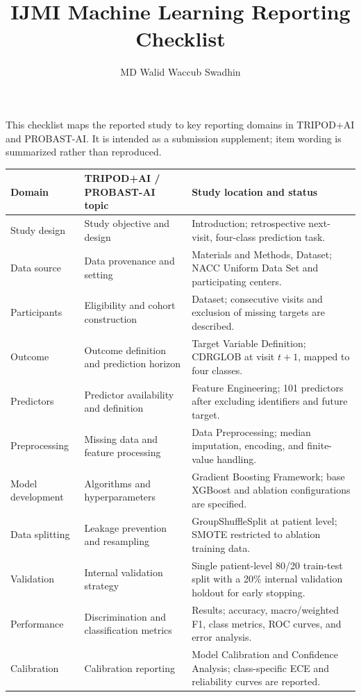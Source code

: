 \documentclass[preprint,12pt]{elsarticle}
\begin{document}
\begin{frontmatter}
\title{IJMI Machine Learning Reporting Checklist}
\author{MD Walid Waccub Swadhin}
\end{frontmatter}

This checklist maps the reported study to key reporting domains in TRIPOD+AI and PROBAST-AI. It is intended as a submission supplement; item wording is summarized rather than reproduced.

\begin{longtable}{p{}p{}p{}}
\toprule
\textbf{Domain} & \textbf{TRIPOD+AI / PROBAST-AI topic} & \textbf{Study location and status} \\
\midrule
\endhead
Study design & Study objective and design & Introduction; retrospective next-visit, four-class prediction task. \\
Data source & Data provenance and setting & Materials and Methods, Dataset; NACC Uniform Data Set and participating centers. \\
Participants & Eligibility and cohort construction & Dataset; consecutive visits and exclusion of missing targets are described. \\
Outcome & Outcome definition and prediction horizon & Target Variable Definition; CDRGLOB at visit $t+1$, mapped to four classes. \\
Predictors & Predictor availability and definition & Feature Engineering; 101 predictors after excluding identifiers and future target. \\
Preprocessing & Missing data and feature processing & Data Preprocessing; median imputation, encoding, and finite-value handling. \\
Model development & Algorithms and hyperparameters & Gradient Boosting Framework; base XGBoost and ablation configurations are specified. \\
Data splitting & Leakage prevention and resampling & GroupShuffleSplit at patient level; SMOTE restricted to ablation training data. \\
Validation & Internal validation strategy & Single patient-level 80/20 train-test split with a 20\% internal validation holdout for early stopping. \\
Performance & Discrimination and classification metrics & Results; accuracy, macro/weighted F1, class metrics, ROC curves, and error analysis. \\
Calibration & Calibration reporting & Model Calibration and Confidence Analysis; class-specific ECE and reliability curves are reported. \\

\end{longtable}
\end{document}
